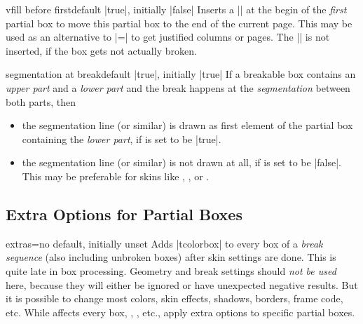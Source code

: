 \begin{docTcbKey}{vfill before first}{}{default |true|, initially |false|}
  Inserts a |\vfill| at the begin of the \emph{first} partial box to move this
  partial box to the end of the current page. This may be used as an alternative
  to |=| to get justified
  columns or pages. The |\vfill| is not inserted, if the box gets not
  actually broken.
\end{docTcbKey}


\begin{docTcbKey}[][doc new=2017-03-20]{segmentation at break}{}{default |true|, initially |true|}
  If a breakable box contains an \emph{upper part} and a \emph{lower part} and
  the break happens at the \emph{segmentation} between both parts, then
  \begin{itemize}
  \item the segmentation line (or similar) is drawn as first element of the
    partial box containing the \emph{lower part}, if 
    is set to be |true|.
  \item the segmentation line (or similar) is not drawn at all, if
     is set to be |false|.
    This may be preferable for skins like , ,
    or .
  \end{itemize}
\end{docTcbKey}


\clearpage
\subsection{Extra Options for Partial Boxes}\label{subsec:extras}


\begin{docTcbKey}[][doc new=2015-07-16]{extras}{=}{no default, initially unset}
  Adds |tcolorbox|  to every box of a \emph{break sequence}
  (also including unbroken boxes) after skin settings are done. This is quite late in box processing.
  Geometry and break settings should \emph{not be used} here, because they
  will either be ignored or have unexpected negative results. But it is possible
  to change most colors, skin effects, shadows, borders, frame code, etc.
  While  affects every box,
  , , etc., apply extra options to specific partial boxes.
\end{docTcbKey}


